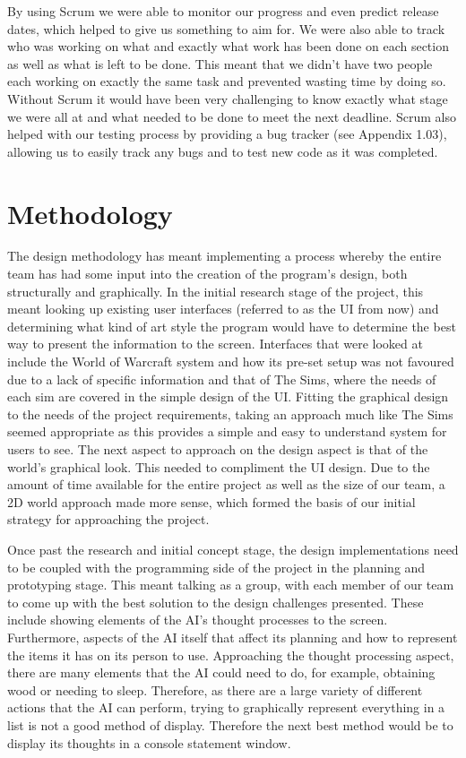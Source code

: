 \documentclass[a4paper]{report}
\begin{document}
By using Scrum we were able to monitor our progress and even predict release dates, which helped to give us something to aim for. We were also able to track who was working on what and exactly what work has been done on each section as well as what is left to be done. This meant that we didn't have two people each working on exactly the same task and prevented wasting time by doing so. Without Scrum it would have been very challenging to know exactly what stage we were all at and what needed to be done to meet the next deadline. Scrum also helped with our testing process by providing a bug tracker (see Appendix 1.03), allowing us to easily track any bugs and to test new code as it was completed. 


\chapter{Methodology}
The design methodology has meant implementing a process whereby the entire team has had some input into the creation of the program’s design, both structurally and graphically. In the initial research stage of the project, this meant looking up existing user interfaces (referred to as the UI from now) and determining what kind of art style the program would have to determine the best way to present the information to the screen. Interfaces that were looked at include the World of Warcraft system and how its pre-set setup was not favoured due to a lack of specific information and that of The Sims, where the needs of each sim are covered in the simple design of the UI. Fitting the graphical design to the needs of the project requirements, taking an approach much like The Sims seemed appropriate as this provides a simple and easy to understand system for users to see. The next aspect to approach on the design aspect is that of the world’s graphical look. This needed to compliment the UI design. Due to the amount of time available for the entire project as well as the size of our team, a 2D world approach made more sense, which formed the basis of our initial strategy for approaching the project.

Once past the research and initial concept stage, the design implementations need to be coupled with the programming side of the project in the planning and prototyping stage. This meant talking as a group, with each member of our team to come up with the best solution to the design challenges presented. These include showing elements of the AI’s thought processes to the screen. Furthermore, aspects of the AI itself that affect its planning and how to represent the items it has on its person to use. Approaching the thought processing aspect, there are many elements that the AI could need to do, for example, obtaining wood or needing to sleep. Therefore, as there are a large variety of different actions that the AI can perform, trying to graphically represent everything in a list is not a good method of display. Therefore the next best method would be to display its thoughts in a console statement window.
\end{document}
